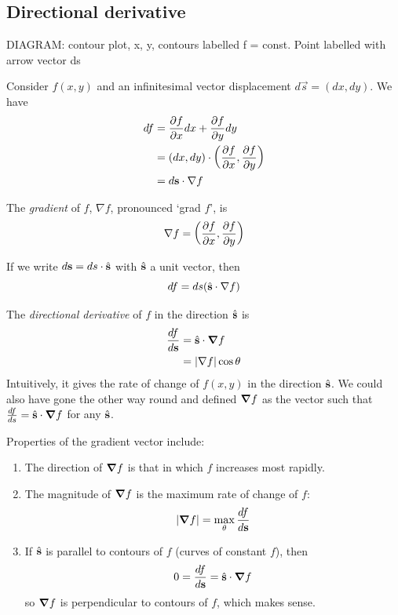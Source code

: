 \documentclass{../../template/note}
\begin{document}
    \subsection{Directional derivative}

    DIAGRAM: contour plot, x, y, contours labelled f = const. Point labelled with arrow vector ds

    Consider \(f(x, y)\) and an infinitesimal vector displacement \(d \vec s = (dx, dy)\). We have
    \begin{align*}
        df &= \pd f x dx + \pd f y dy \\
        &= (dx, dy) \cdot \left(\pd f x, \pd f y\right) \\
        &= d \vec s \cdot \nabla f
    \end{align*}
    
    \begin{definition}
        The \emph{gradient} of \(f\), \(\nabla f\), pronounced `grad \(f\)', is
        \[
            \nabla f = \left(\pd f x, \pd f y\right)
        \]  
    \end{definition}
    If we write \(d \vec s = ds \cdot \hvec s\) with \(\hvec s\) a unit vector, then
    \[
        df = ds (\hvec s \cdot \nabla f)
    \]
    \begin{definition}
        The \emph{directional derivative} of \(f\) in the direction \(\hvec s\) is
        \begin{align*}
            \frac{df}{d\vec s} &= \hvec s \cdot \grad f \\
            &= |\nabla f|\cos \theta 
        \end{align*}
        Intuitively, it gives the rate of change of \(f(x, y)\) in the direction \(\hvec s\). We could also have gone the other way round and defined \(\grad f\) as the vector such that \(\frac{df}{ds} = \hvec s \cdot \grad f\) for any \(\hvec s\).
    \end{definition}
    
    Properties of the gradient vector include:
    \begin{enumerate}[label=\protect\circled{\arabic*}]
        \item The direction of \(\grad f\) is that in which \(f\) increases most rapidly.
        \item The magnitude of \(\grad f\) is the maximum rate of change of \(f\):
        \[
            |\grad f| = \max_{\theta} \frac{df}{d\vec s}
        \]
        \item If \(\hvec s\) is parallel to contours of \(f\) (curves of constant \(f\)), then
        \begin{align*}
            0 = \frac{df}{d \vec s} = \hvec s \cdot \grad f
        \end{align*}
        so \(\grad f\) is perpendicular to contours of \(f\), which makes sense.
    \end{enumerate}
    
\end{document}

